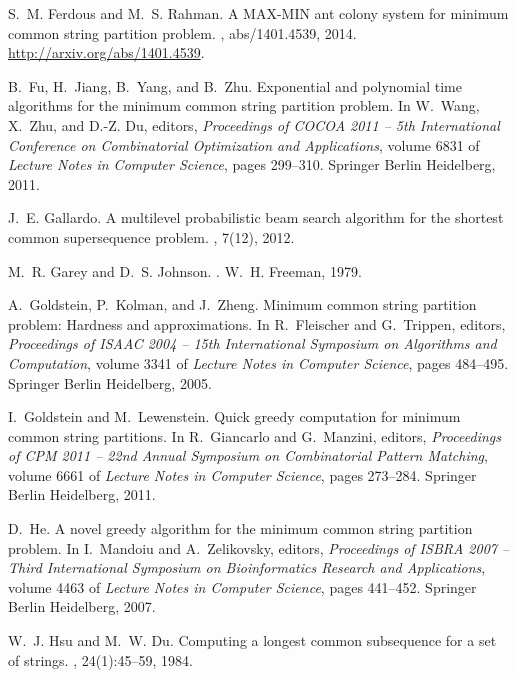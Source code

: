 \documentclass[11pt,a4paper]{article}
\begin{document}
\begin{thebibliography}{10}
S.~M. Ferdous and M.~S. Rahman.
\newblock A {MAX-MIN} ant colony system for minimum common string partition
  problem.
, abs/1401.4539, 2014.
\newblock \url{http://arxiv.org/abs/1401.4539}.

B.~Fu, H.~Jiang, B.~Yang, and B.~Zhu.
\newblock Exponential and polynomial time algorithms for the minimum common
  string partition problem.
\newblock In W.~Wang, X.~Zhu, and D.-Z. Du, editors, {\em Proceedings of COCOA
  2011 -- 5th International Conference on Combinatorial Optimization and
  Applications}, volume 6831 of {\em Lecture Notes in Computer Science}, pages
  299--310. Springer Berlin Heidelberg, 2011.

J.~E. Gallardo.
\newblock A multilevel probabilistic beam search algorithm for the shortest
  common supersequence problem.
, 7(12), 2012.

M.~R. Garey and D.~S. Johnson.
.
\newblock W.~H. Freeman, 1979.

A.~Goldstein, P.~Kolman, and J.~Zheng.
\newblock Minimum common string partition problem: Hardness and approximations.
\newblock In R.~Fleischer and G.~Trippen, editors, {\em Proceedings of ISAAC
  2004 -- 15th International Symposium on Algorithms and Computation}, volume
  3341 of {\em Lecture Notes in Computer Science}, pages 484--495. Springer
  Berlin Heidelberg, 2005.

I.~Goldstein and M.~Lewenstein.
\newblock Quick greedy computation for minimum common string partitions.
\newblock In R.~Giancarlo and G.~Manzini, editors, {\em Proceedings of CPM 2011
  -- 22nd Annual Symposium on Combinatorial Pattern Matching}, volume 6661 of
  {\em Lecture Notes in Computer Science}, pages 273--284. Springer Berlin
  Heidelberg, 2011.

D.~He.
\newblock A novel greedy algorithm for the minimum common string partition
  problem.
\newblock In I.~Mandoiu and A.~Zelikovsky, editors, {\em Proceedings of ISBRA
  2007 -- Third International Symposium on Bioinformatics Research and
  Applications}, volume 4463 of {\em Lecture Notes in Computer Science}, pages
  441--452. Springer Berlin Heidelberg, 2007.

W.~J. Hsu and M.~W. Du.
\newblock Computing a longest common subsequence for a set of strings.
, 24(1):45--59, 1984.


\end{thebibliography}
\end{document}
